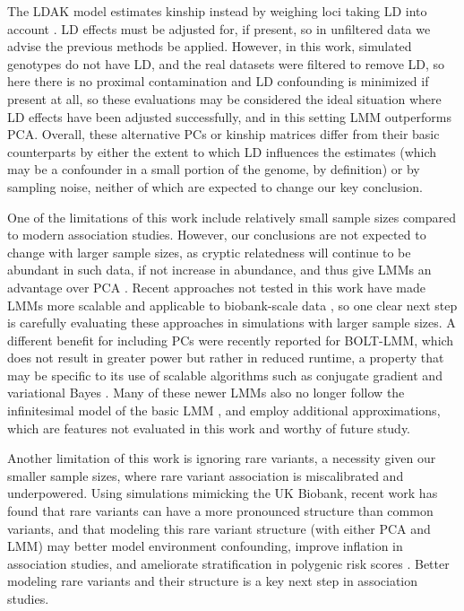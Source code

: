 \documentclass[11pt]{article}
\begin{document}
\begin{linenumbers}
The LDAK model estimates kinship instead by weighing loci taking LD into account \citep{speed_improved_2012}.
LD effects must be adjusted for, if present, so in unfiltered data we advise the previous methods be applied.
However, in this work, simulated genotypes do not have LD, and the real datasets were filtered to remove LD, so here there is no proximal contamination and LD confounding is minimized if present at all, so these evaluations may be considered the ideal situation where LD effects have been adjusted successfully, and in this setting LMM outperforms PCA.
Overall, these alternative PCs or kinship matrices differ from their basic counterparts by either the extent to which LD influences the estimates (which may be a confounder in a small portion of the genome, by definition) or by sampling noise, neither of which are expected to change our key conclusion.

One of the limitations of this work include relatively small sample sizes compared to modern association studies.
However, our conclusions are not expected to change with larger sample sizes, as cryptic relatedness will continue to be abundant in such data, if not increase in abundance, and thus give LMMs an advantage over PCA \citep{henn_cryptic_2012, shchur_number_2018, loh_mixed-model_2018}.
Recent approaches not tested in this work have made LMMs more scalable and applicable to biobank-scale data \citep{loh_efficient_2015, zhou_efficiently_2018, mbatchou_computationally_2021}, so one clear next step is carefully evaluating these approaches in simulations with larger sample sizes.
A different benefit for including PCs were recently reported for BOLT-LMM, which does not result in greater power but rather in reduced runtime, a property that may be specific to its use of scalable algorithms such as conjugate gradient and variational Bayes \citep{loh_mixed-model_2018}.
Many of these newer LMMs also no longer follow the infinitesimal model of the basic LMM \citep{loh_efficient_2015, mbatchou_computationally_2021}, and employ additional approximations, which are features not evaluated in this work and worthy of future study.

Another limitation of this work is ignoring rare variants, a necessity given our smaller sample sizes, where rare variant association is miscalibrated and underpowered.
Using simulations mimicking the UK Biobank, recent work has found that rare variants can have a more pronounced structure than common variants, and that modeling this rare variant structure (with either PCA and LMM) may better model environment confounding, improve inflation in association studies, and ameliorate stratification in polygenic risk scores \citep{zaidi_demographic_2020}.
Better modeling rare variants and their structure is a key next step in association studies.


\end{linenumbers}
\end{document}

